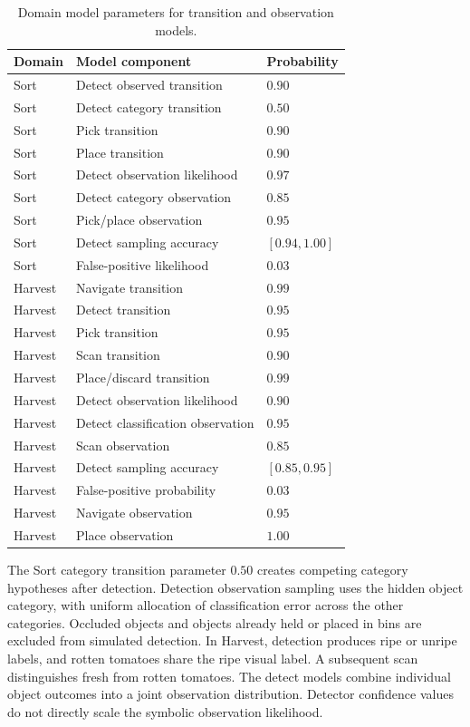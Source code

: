 \begin{table}[!htbp]
\centering
\caption{Domain model parameters for transition and observation models.}
\label{tab:app_model_params}
\small
\begin{tabular}{lll}
\toprule
\textbf{Domain} & \textbf{Model component} & \textbf{Probability} \\
\midrule
Sort & Detect observed transition & $0.90$ \\
Sort & Detect category transition & $0.50$ \\
Sort & Pick transition & $0.90$ \\
Sort & Place transition & $0.90$ \\
Sort & Detect observation likelihood & $0.97$ \\
Sort & Detect category observation & $0.85$ \\
Sort & Pick/place observation & $0.95$ \\
Sort & Detect sampling accuracy & $[0.94,1.00]$ \\
Sort & False-positive likelihood & $0.03$ \\
\midrule
Harvest & Navigate transition & $0.99$ \\
Harvest & Detect transition & $0.95$ \\
Harvest & Pick transition & $0.95$ \\
Harvest & Scan transition & $0.90$ \\
Harvest & Place/discard transition & $0.99$ \\
Harvest & Detect observation likelihood & $0.90$ \\
Harvest & Detect classification observation & $0.95$ \\
Harvest & Scan observation & $0.85$ \\
Harvest & Detect sampling accuracy & $[0.85,0.95]$ \\
Harvest & False-positive probability & $0.03$ \\
Harvest & Navigate observation & $0.95$ \\
Harvest & Place observation & $1.00$ \\
\bottomrule
\end{tabular}
\end{table}

The Sort category transition parameter $0.50$ creates competing category hypotheses after detection. Detection observation sampling uses the hidden object category, with uniform allocation of classification error across the other categories. Occluded objects and objects already held or placed in bins are excluded from simulated detection. In Harvest, detection produces ripe or unripe labels, and rotten tomatoes share the ripe visual label. A subsequent scan distinguishes fresh from rotten tomatoes. The detect models combine individual object outcomes into a joint observation distribution. Detector confidence values do not directly scale the symbolic observation likelihood.

